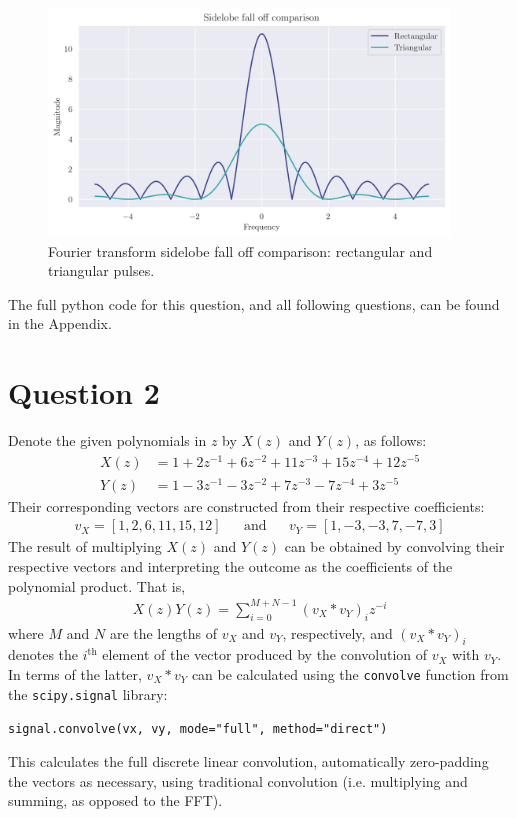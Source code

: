 \documentclass[a4paper, 11pt]{article}
\begin{document}
\begin{figure}[ht]
    \centering
    \includegraphics[width=0.95\textwidth]{images/q1_sidelobes.png}
    \caption{Fourier transform sidelobe fall off comparison: rectangular and
             triangular pulses.}
    \label{fig:q1_sidelobes}
\end{figure}

The full python code for this question, and all following questions, can be
found in the Appendix.

\newpage
\section*{Question 2}

Denote the given polynomials in $z$ by $X(z)$ and $Y(z)$, as follows:
\begin{align*}
    X(z) &= 1 + 2z^{-1} + 6z^{-2} + 11z^{-3} + 15z^{-4} + 12z^{-5} \\
    Y(z) &= 1 - 3z^{-1} - 3z^{-2} + 7z^{-3} - 7z^{-4} + 3z^{-5}
\end{align*}
Their corresponding vectors are constructed from their respective coefficients:
\begin{align*}
    v_X = [1, 2, 6, 11, 15, 12] && \text{and} && v_Y = [1, -3, -3, 7, -7, 3]
\end{align*}
The result of multiplying $X(z)$ and $Y(z)$ can be obtained by convolving their
respective vectors and interpreting the outcome as the coefficients of the
polynomial product. That is,
\begin{align*}
    X(z)Y(z) = \sum_{i=0}^{M+N-1} (v_X \ast v_Y)_i z^{-i}
\end{align*}
where $M$ and $N$ are the lengths of $v_X$ and $v_Y$, respectively, and
$(v_X\ast v_Y)_i$ denotes the $i^\text{th}$ element of the vector produced by
the convolution of $v_X$ with $v_Y$. In terms of the latter, $v_X\ast v_Y$ can
be calculated using the \texttt{convolve} function from the
\texttt{scipy.signal} library:
\begin{center}
    \texttt{signal.convolve(vx, vy, mode="full", method="direct")}
\end{center}
This calculates the full discrete linear convolution, automatically
zero-padding the vectors as necessary, using traditional convolution (i.e.
multiplying and summing, as opposed to the FFT).
\end{document}
